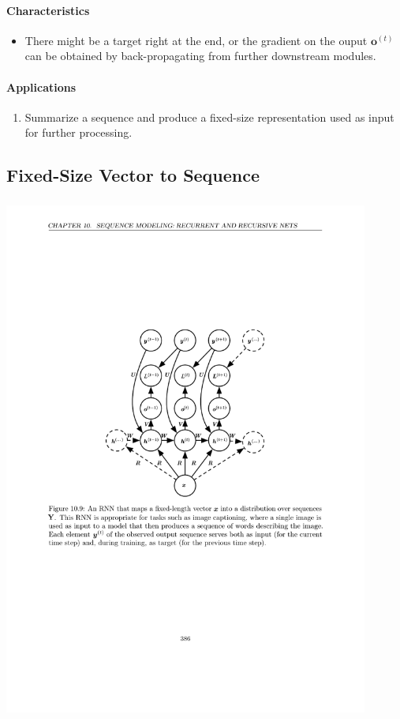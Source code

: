 \documentclass[12pt, a4paper]{article}
\newcommand{\egvo}[1]{\boldsymbol{o}^{(#1)}}
\begin{document}
\paragraph{Characteristics}
\begin{itemize}
    \item There might be a target right at the end, or the gradient on the ouput $\egvo{t}$ can be obtained by back-propagating from further downstream modules.
\end{itemize}
\paragraph{Applications}
\begin{enumerate}
    \item Summarize a sequence and produce a fixed-size representation used as input for further processing.
\end{enumerate}


\subsection{Fixed-Size Vector to Sequence}
\subsubsection{}
\begin{center}
    \includegraphics[width=0.9\textwidth]{../imgs/RNN_4.pdf}
\end{center}
\end{document}
